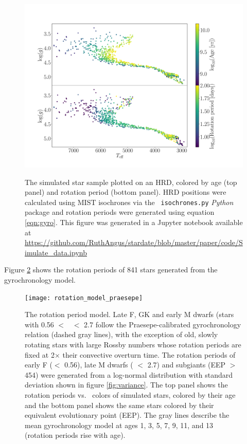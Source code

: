 \begin{figure}
  \caption{
      The simulated star sample plotted on an HRD, colored by age
    (top panel) and rotation period (bottom panel).
    HRD positions were calculated using MIST isochrones via the {\tt
    isochrones.py} {\it Python} package and rotation periods were generated
    using equation \ref{eqn:gyro}.
    This figure was generated in a Jupyter notebook available at
    \url{https://github.com/RuthAngus/stardate/blob/master/paper/code/Simulate_data.ipynb}
}
  \centering
    \includegraphics[width=1\textwidth]{simulated_CMD}
\label{fig:CMD_age}
\end{figure}
Figure \ref{fig:rotation_model} shows the rotation periods of 841
stars generated from the gyrochronology model.
\begin{figure}
  \caption{
The rotation period model.
    Late F, GK and early M dwarfs (stars with 0.56 $<$ \gcolor\ $<$ 2.7 follow
    the Praesepe-calibrated gyrochronology relation (dashed gray lines), with
    the exception of old, slowly
    rotating stars with large Rossby numbers whose rotation periods are fixed
    at 2$\times$ their convective overturn time.
    The rotation periods of early F (\gcolor $<$ 0.56), late M dwarfs (\gcolor
    $<$ 2.7) and subgiants (EEP $>$ 454) were generated
    from a log-normal distribution with standard deviation shown in figure
    \ref{fig:variance}.
The top panel shows the rotation periods vs. \gcolor\ colors of simulated stars,
    colored by their age and the bottom panel shows the same stars colored
    by their equivalent evolutionary point (EEP).
    The gray lines describe the mean gyrochronology model at ages 1,
    3, 5, 7, 9, 11, and 13 (rotation periods rise with age).
}
  \centering
    \texttt{[image: rotation\_model\_praesepe]}
\label{fig:rotation_model}
\end{figure}


